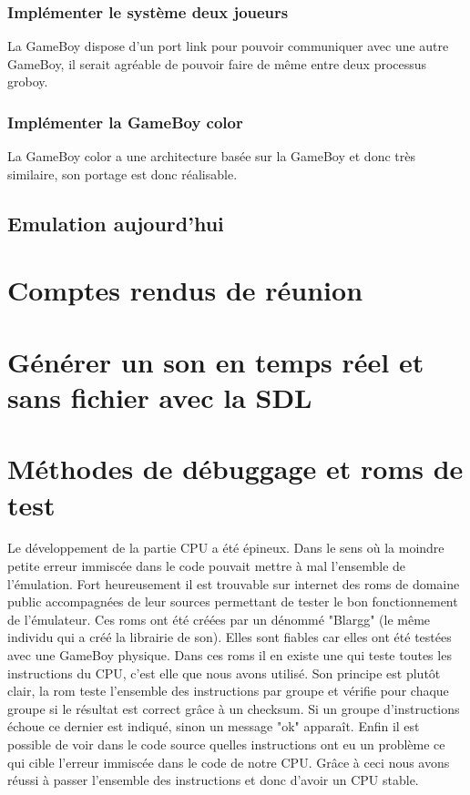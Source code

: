 \documentclass{report}
\begin{document}
\subsection*{Implémenter le système deux joueurs}
La GameBoy dispose d'un port link pour pouvoir communiquer avec une autre GameBoy, il serait agréable de pouvoir faire de même entre deux processus groboy.
\subsection*{Implémenter la GameBoy color}
La GameBoy color a une architecture basée sur la GameBoy et donc très similaire, son portage est donc réalisable. 
\section*{Emulation aujourd'hui}


\appendix
\chapter{Comptes rendus de réunion}
\chapter{Générer un son en temps réel et sans fichier avec la SDL}
\chapter{Méthodes de débuggage et roms de test}
Le développement de la partie CPU a été épineux. Dans le sens où la moindre petite erreur immiscée dans le code pouvait mettre à mal l'ensemble de l'émulation. Fort heureusement il est trouvable sur internet des roms de domaine public accompagnées de leur sources permettant de tester le bon fonctionnement de l'émulateur. Ces roms ont été créées par un dénommé "Blargg" (le même individu qui a créé la librairie de son). Elles sont fiables car elles ont été testées avec une GameBoy physique. Dans ces roms il en existe une qui teste toutes les instructions du CPU, c'est elle que nous avons utilisé. Son principe est plutôt clair, la rom teste l'ensemble des instructions par groupe et vérifie pour chaque groupe si le résultat est correct grâce à un checksum. Si un groupe d'instructions échoue ce dernier est indiqué, sinon un message "ok" apparaît. Enfin il est possible de voir dans le code source quelles instructions ont eu un problème ce qui cible l'erreur immiscée dans le code de notre CPU. Grâce à ceci nous avons réussi à passer l'ensemble des instructions et donc d'avoir un CPU stable.
\end{document}
